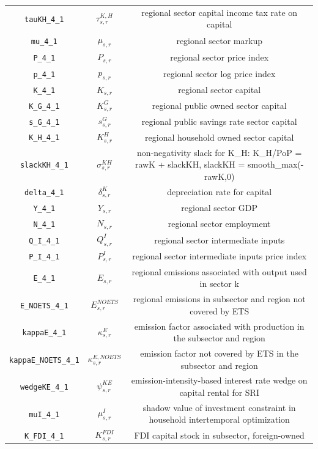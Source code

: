 \begin{center}
\begin{longtable}{ccc}
\texttt{tauKH\_4\_1} & ${\tau^{K,H}_{s,r}}$ & regional sector capital income tax rate on capital\\
\texttt{mu\_4\_1} & ${\mu_{s,r}}$ & regional sector markup\\
\texttt{P\_4\_1} & ${P_{s,r}}$ & regional sector price index\\
\texttt{p\_4\_1} & ${p_{s,r}}$ & regional sector log price index\\
\texttt{K\_4\_1} & ${K_{s,r}}$ & regional sector capital\\
\texttt{K\_G\_4\_1} & ${K^G_{s,r}}$ & regional public owned sector capital\\
\texttt{s\_G\_4\_1} & ${s^G_{s,r}}$ & regional public savings rate sector capital\\
\texttt{K\_H\_4\_1} & ${K^H_{s,r}}$ & regional household owned sector capital\\
\texttt{slackKH\_4\_1} & ${\sigma^{KH}_{s,r}}$ & non-negativity slack for K\_H: K\_H/PoP = rawK + slackKH, slackKH = smooth\_max(-rawK,0)\\
\texttt{delta\_4\_1} & ${\delta^{K}_{s,r}}$ & depreciation rate for capital\\
\texttt{Y\_4\_1} & ${Y_{s,r}}$ & regional sector GDP\\
\texttt{N\_4\_1} & ${N_{s,r}}$ & regional sector employment\\
\texttt{Q\_I\_4\_1} & ${Q^{I}_{s,r}}$ & regional sector intermediate inputs\\
\texttt{P\_I\_4\_1} & ${P^{I}_{s,r}}$ & regional sector intermediate inputs price index\\
\texttt{E\_4\_1} & ${E_{s,r}}$ & regional emissions associated with output used in sector k\\
\texttt{E\_NOETS\_4\_1} & ${E^{NOETS}_{s,r}}$ & regional emissions in subsector and region not covered by ETS\\
\texttt{kappaE\_4\_1} & ${\kappa^{E}_{s,r}}$ & emission factor associated with production in the subsector and region\\
\texttt{kappaE\_NOETS\_4\_1} & ${\kappa^{E,NOETS}_{s,r}}$ & emission factor not covered by ETS in the subsector and region\\
\texttt{wedgeKE\_4\_1} & ${\psi^{KE}_{s,r}}$ & emission-intensity-based interest rate wedge on capital rental for SRI\\
\texttt{muI\_4\_1} & ${\mu^{I}_{s,r}}$ & shadow value of investment constraint in household intertemporal optimization\\
\texttt{K\_FDI\_4\_1} & ${K^{FDI}_{s,r}}$ & FDI capital stock in subsector, foreign-owned\\

\end{longtable}
\end{center}
